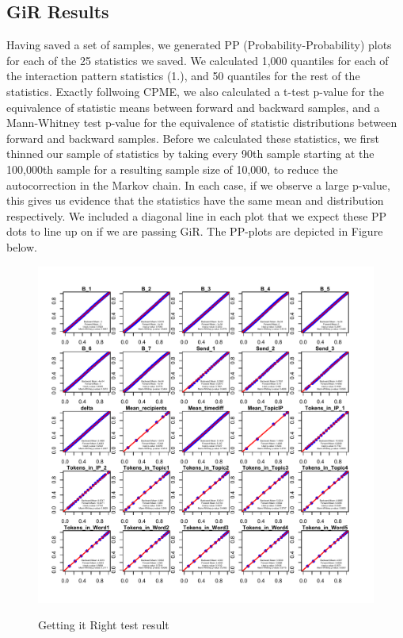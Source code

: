 \documentclass[a4paper]{article}
\begin{document}
\subsection{GiR Results}
Having saved a set of samples, we generated PP (Probability-Probability)  plots for each of the 25 statistics we saved. We calculated 1,000 quantiles for each of the interaction pattern statistics (1.), and 50 quantiles for the rest of the statistics. Exactly follwoing CPME, we also calculated a t-test p-value for the equivalence
of statistic means between forward and backward samples, and a Mann-Whitney test p-value for the equivalence of statistic
distributions between forward and backward samples. Before we calculated these statistics, we first thinned our sample of
statistics by taking every 90th sample starting at the 100,000th sample for a resulting sample size of 10,000, to reduce the autocorrection in the Markov chain. In each case, if we observe a large p-value, this gives us evidence that the statistics have the same mean and distribution respectively. We included a diagonal line in each plot that we expect these PP dots to line up on if we are passing GiR. The PP-plots are depicted in Figure below.
\begin{figure}[H]
	\centering
	\includegraphics[width=1.05\textwidth]{Rplot.pdf} 
	\label{fig:GiR}
	\caption{Getting it Right test result}
\end{figure}
\end{document}
